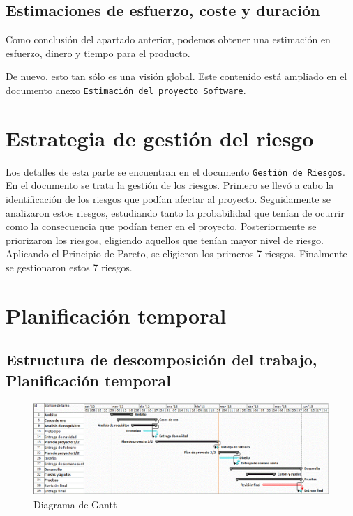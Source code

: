 \documentclass[spanish,a4paper,12pt]{report}	%
\begin{document}
	\section{Estimaciones de esfuerzo, coste y duración}
		Como conclusión del apartado anterior, podemos obtener una estimación en esfuerzo, dinero y tiempo para el producto.


		De nuevo, esto tan sólo es una visión global. Este contenido está ampliado en el
		documento anexo \texttt{Estimación del proyecto Software}.


\newpage
\mbox{}
\thispagestyle{empty}						%
\newpage
\setcounter{section}{0}

\chapter{Estrategia de gestión del riesgo}

	Los detalles de esta parte se encuentran en el documento \texttt{Gestión de Riesgos}.\\
	En el documento se trata la gestión de los riesgos. Primero se llevó a cabo la identificación de los riesgos que podían afectar al proyecto.
	Seguidamente se analizaron estos riesgos, estudiando tanto la probabilidad que tenían de ocurrir como la consecuencia que podían 
	tener en el proyecto. Posteriormente se priorizaron los riesgos, eligiendo aquellos que tenían mayor nivel de riesgo. Aplicando el Principio de Pareto, 
	se eligieron los primeros 7 riesgos.
	Finalmente se gestionaron estos 7 riesgos.

\newpage
\mbox{}
\thispagestyle{empty}						%
\newpage
\setcounter{section}{0}

\chapter{Planificación temporal}

	\section{Estructura de descomposición del trabajo, Planificación temporal}

	\begin{figure}[!h]
	\centering
	\includegraphics[scale=0.57]{GraficoGantt.png}
	\caption{Diagrama de Gantt}
	\end{figure}
\end{document}
